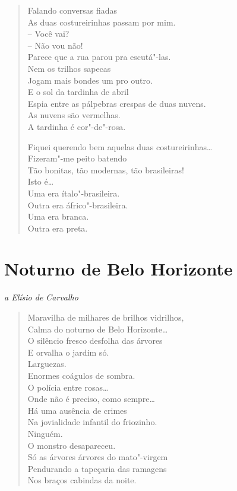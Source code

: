 {\begin{verse}
Falando conversas fiadas\\
As duas costureirinhas passam por mim.\\
-- Você vai?\\
\qquad\qquad{}-- Não vou não!\\
Parece que a rua parou pra escutá"-las.\\
Nem os trilhos sapecas\\
Jogam mais bondes um pro outro.\\
E o sol da tardinha de abril\\
Espia entre as pálpebras crespas de duas nuvens.\\
As nuvens são vermelhas.\\
A tardinha é cor"-de"-rosa.

Fiquei querendo bem aquelas duas costureirinhas\ldots{}\\
Fizeram"-me peito batendo\\
Tão bonitas, tão modernas, tão brasileiras!\\
Isto é\ldots{}\\
Uma era ítalo"-brasileira.\\
Outra era áfrico"-brasileira.\\
Uma era branca.\\
Outra era preta.
\end{verse}

\chapter[Noturno de Belo Horizonte]{Noturno de Belo Horizonte }

\begin{flushright}
\emph{a Elísio de Carvalho}
\end{flushright}

\begin{verse}
Maravilha de milhares de brilhos vidrilhos,\\
Calma do noturno de Belo Horizonte\ldots{}\\
O silêncio fresco desfolha das árvores\\
E orvalha o jardim só.\\
Larguezas.\\
Enormes coágulos de sombra.\\
O polícia entre rosas\ldots{}\\
\qquad{}Onde não é preciso, como sempre\ldots{}\\
Há uma ausência de crimes\\
Na jovialidade infantil do friozinho.\\
Ninguém.\\
O monstro desapareceu.\\
Só as árvores árvores do mato"-virgem\\
Pendurando a tapeçaria das ramagens\\
Nos braços cabindas da noite.


\end{verse}}
